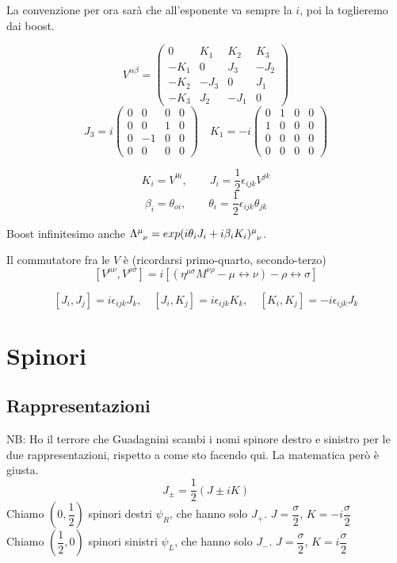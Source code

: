 \documentclass[12pt,a4paper]{article}
\begin{document}
	La convenzione per ora sarà che all'esponente va sempre la $i$, poi la toglieremo dai boost.
	
	\[ V^{\alpha\beta} = \begin{pmatrix}
	0 & K_1 & K_2 & K_3 \\
	-K_1 & 0 & J_3 & -J_2 \\
	-K_2 & -J_3 & 0 & J_1 \\
	-K_3 & J_2 & -J_1 & 0 
	\end{pmatrix} \]
	\[ J_3 = i\begin{pmatrix}
	0 & 0 & 0 & 0 \\
	0 & 0 & 1 & 0 \\
	0 & -1 & 0 & 0 \\
	0 & 0 & 0 & 0 
	\end{pmatrix}
	\quad
	K_1 = -i\begin{pmatrix}
	0 & 1 & 0 & 0 \\
	1 & 0 & 0 & 0 \\
	0 & 0 & 0 & 0 \\
	0 & 0 & 0 & 0 
	\end{pmatrix}
	\]
	
	\[ K_i = V^{0i},\qquad J_i = \dfrac{1}{2} \epsilon_{ijk} V^{jk} \]
	\[ \beta_i = \theta_{oi},\qquad \theta_i = \dfrac{1}{2} \epsilon_{ijk} \theta_{jk} \]
	
	Boost infinitesimo anche $\Lambda\indices{^\mu_\nu} = exp(i \theta_i J_i + i\beta_i K_i)\indices{^\mu_\nu}$.
	
	Il commutatore fra le $V$ è (ricordarsi primo-quarto, secondo-terzo)
	\[ [V^{\mu\nu}, V^{\rho\sigma}] = i [(\eta^{\mu\sigma} M^{\nu\rho} - \mu\leftrightarrow\nu) - \rho\leftrightarrow\sigma ] \]
	
	\[ [J_i, J_j] = i \epsilon_{ijk} J_k,\quad [J_i, K_j] = i \epsilon_{ijk} K_k,\quad [K_i, K_j] = -i\epsilon_{ijk} J_k \]
	
	\section{Spinori}
	\subsection{Rappresentazioni}
	NB: Ho il terrore che Guadagnini scambi i nomi spinore destro e sinistro per le due rappresentazioni, rispetto a come sto facendo qui. La matematica però è giusta.
	\[ J_\pm = \dfrac{1}{2} (J\pm i K) \]
	Chiamo $\left(0, \dfrac{1}{2}\right)$ spinori destri $\psi_R$, che hanno solo $J_+$. $J=\dfrac{\sigma}{2}$, $K = -i\dfrac{\sigma}{2}$\\
	Chiamo $\left(\dfrac{1}{2}, 0\right)$ spinori sinistri $\psi_L$, che hanno solo $J_-$. $J=\dfrac{\sigma}{2}$, $K = i\dfrac{\sigma}{2}$
	
\end{document}
